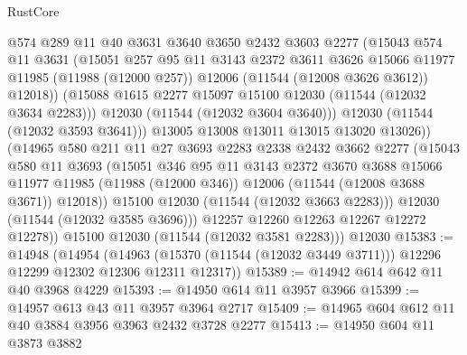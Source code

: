 \begin{lexlean}{RustCore}
\begin{coremodule}
                    @574
                    @289
                    @11
                    @40
                    @3631
                    @3640
                    @3650
                    @2432
                    @3603
                    @2277
                    (@15043
                      @574
                      @11
                      @3631
                      (@15051
                        @257
                        @95
                        @11
                        @3143
                        @2372
                        @3611
                        @3626
                        @15066
                        @11977
                        @11985
                        (@11988 (@12000 @257))
                        @12006
                        (@11544 (@12008 @3626 @3612))
                        @12018))
                    (@15088 @1615 @2277 @15097 @15100 @12030 (@11544 (@12032 @3634 @2283)))
                    @12030
                    (@11544 (@12032 @3604 @3640)))
                  @12030
                  (@11544 (@12032 @3593 @3641)))
                @13005
                @13008
                @13011
                @13015
                @13020
                @13026))
            (@14965
              @580
              @211
              @11
              @27
              @3693
              @2283
              @2338
              @2432
              @3662
              @2277
              (@15043
                @580
                @11
                @3693
                (@15051
                  @346
                  @95
                  @11
                  @3143
                  @2372
                  @3670
                  @3688
                  @15066
                  @11977
                  @11985
                  (@11988 (@12000 @346))
                  @12006
                  (@11544 (@12008 @3688 @3671))
                  @12018))
              @15100
              @12030
              (@11544 (@12032 @3663 @2283)))
            @12030
            (@11544 (@12032 @3585 @3696)))
          @12257
          @12260
          @12263
          @12267
          @12272
          @12278))
      @15100
      @12030
      (@11544 (@12032 @3581 @2283)))
    @12030
@15383 := @14948
    (@14954
      (@14963 (@15370 (@11544 (@12032 @3449 @3711))) @12296 @12299 @12302 @12306 @12311 @12317))
@15389 := @14942 @614 @642 @11 @40 @3968 @4229
@15393 := @14950 @614 @11 @3957 @3966
@15399 := @14957 @613 @43 @11 @3957 @3964 @2717
@15409 := @14965 @604 @612 @11 @40 @3884 @3956 @3963 @2432 @3728 @2277
@15413 := @14950 @604 @11 @3873 @3882

\end{coremodule}
\end{lexlean}

